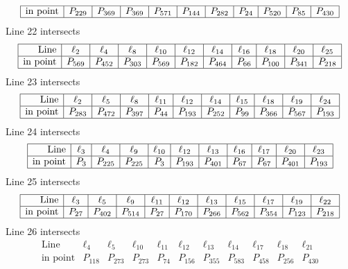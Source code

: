 \documentclass{article}
\begin{document}
{$$\begin{array}{|r*{10}{|c}|}
\hline
\mbox{in point}  & P_{229} & P_{369} & P_{369} & P_{571} & P_{144} & P_{282} & P_{24} & P_{520} & P_{85} & P_{430}\\
\hline
\end{array}
$$
Line 22 intersects 
$$
\begin{array}{|r*{10}{|c}|}
\hline
\mbox{Line}  & \ell_{2} & \ell_{4} & \ell_{8} & \ell_{10} & \ell_{12} & \ell_{14} & \ell_{16} & \ell_{18} & \ell_{20} & \ell_{25}\\
\hline
\mbox{in point}  & P_{569} & P_{452} & P_{303} & P_{569} & P_{182} & P_{464} & P_{66} & P_{100} & P_{341} & P_{218}\\
\hline
\end{array}
$$
Line 23 intersects 
$$
\begin{array}{|r*{10}{|c}|}
\hline
\mbox{Line}  & \ell_{2} & \ell_{5} & \ell_{8} & \ell_{11} & \ell_{12} & \ell_{14} & \ell_{15} & \ell_{18} & \ell_{19} & \ell_{24}\\
\hline
\mbox{in point}  & P_{283} & P_{472} & P_{397} & P_{44} & P_{193} & P_{252} & P_{99} & P_{366} & P_{567} & P_{193}\\
\hline
\end{array}
$$
Line 24 intersects 
$$
\begin{array}{|r*{10}{|c}|}
\hline
\mbox{Line}  & \ell_{3} & \ell_{4} & \ell_{9} & \ell_{10} & \ell_{12} & \ell_{13} & \ell_{16} & \ell_{17} & \ell_{20} & \ell_{23}\\
\hline
\mbox{in point}  & P_{3} & P_{225} & P_{225} & P_{3} & P_{193} & P_{401} & P_{67} & P_{67} & P_{401} & P_{193}\\
\hline
\end{array}
$$
Line 25 intersects 
$$
\begin{array}{|r*{10}{|c}|}
\hline
\mbox{Line}  & \ell_{3} & \ell_{5} & \ell_{9} & \ell_{11} & \ell_{12} & \ell_{13} & \ell_{15} & \ell_{17} & \ell_{19} & \ell_{22}\\
\hline
\mbox{in point}  & P_{27} & P_{402} & P_{514} & P_{27} & P_{170} & P_{266} & P_{562} & P_{354} & P_{123} & P_{218}\\
\hline
\end{array}
$$
Line 26 intersects 
$$
\begin{array}{|r*{10}{|c}|}
\hline
\mbox{Line}  & \ell_{4} & \ell_{5} & \ell_{10} & \ell_{11} & \ell_{12} & \ell_{13} & \ell_{14} & \ell_{17} & \ell_{18} & \ell_{21}\\
\hline
\mbox{in point}  & P_{118} & P_{273} & P_{273} & P_{74} & P_{156} & P_{355} & P_{583} & P_{458} & P_{256} & P_{430}\\

\end{array}$$}
\end{document}
